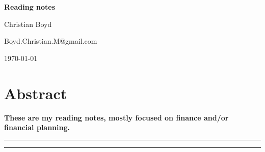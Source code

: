 \begin{center}{\Large \textbf{
Reading notes
}}\end{center}

\begin{center}
Christian Boyd
\end{center}

\begin{center}
{\small \sf Boyd.Christian.M@gmail.com}
\end{center}

\begin{center}
\today
\end{center}


\section*{Abstract}
{\bf
These are my reading notes, mostly focused on finance and/or financial planning.
}

\vspace{10pt}
\noindent\rule{\textwidth}{1pt}
\tableofcontents
\noindent\rule{\textwidth}{1pt}
\vspace{10pt}